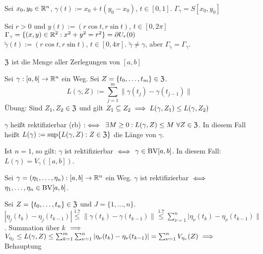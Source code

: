 \documentclass[a4paper,twoside,DIV15,BCOR12mm,chapterprefix=true,headings=twolinechapter]{scrbook}
\begin{document}
\begin{beispiele}
\item Sei $x_0, y_0\in\mathbb{R}^n$, $\gamma(t) := x_0 + t(y_0-x_0)$, $t\in[0,1]$. $\Gamma_\gamma=S[x_0,y_0]$
\item Sei $r>0$ und $y(t) := (r \cos t, r \sin t)$, $t\in[0,2\pi]$\\ $\Gamma_\gamma=\{(x,y)\in\mathbb{R}^2: x^2+y^2=r^2\} = \partial U_r(0)$ \\
$\tilde\gamma(t) := (r \cos t, r \sin t)$, $t\in[0,4\pi]$. $\tilde\gamma \ne \gamma$, aber $\Gamma_{\tilde\gamma} = \Gamma_\gamma$.
\end{beispiele}

\begin{erinnerung}
$\mathfrak{Z}$ ist die Menge aller Zerlegungen von $[a,b]$
\end{erinnerung}

\begin{definition}
Sei $\gamma:[a,b]\to \mathbb{R}^n$ ein Weg. Sei $Z=\{t_0, \ldots, t_m\} \in \mathfrak{Z}$.\\
$$L(\gamma,Z):= \sum_{j=1}^m\|\gamma(t_j) - \gamma(t_{j-1})\|$$
Übung: Sind $Z_1,Z_2\in\mathfrak{Z}$ und gilt $Z_1 \subseteq Z_2 \implies L(\gamma,Z_1) \le L(\gamma,Z_2)$

$\gamma$ heißt rektifizierbar (rb)  $:\iff$ $\exists M\ge0: L(\gamma,Z)\le M\ \forall Z\in\mathfrak{Z}$. In diesem Fall heißt $L(\gamma) := \sup\{L(\gamma,Z): Z\in\mathfrak{Z}\}$ die Länge von $\gamma$.

Ist $n=1$, so gilt: $\gamma$ ist rektifizierbar $\iff$ $\gamma\in \text{BV}[a,b]$. In diesem Fall: $L(\gamma) = V_\gamma([a,b])$.
\end{definition}

\begin{satz}
Sei $\gamma = (\eta_1, \ldots, \eta_n):[a,b]\to\mathbb{R}^n$ ein Weg. $\gamma$ ist rektifizierbar $\iff$ \mbox{$\eta_1,\ldots,\eta_n\in \text{BV}[a,b]$}.
\end{satz}

\begin{beweis}
Sei $Z = \{t_0,\ldots,t_n\} \in \mathfrak{Z}$ und $J=\{1,\ldots,n\}$.\\
$|\eta_j(t_k)-\eta_j(t_{k-1})| \stackrel{\text{1.7}}{\le} \|\gamma(t_k) - \gamma(t_{k-1})\| \stackrel{\text{1.7}}\le \sum_{\nu=1}^n |\eta_\nu(t_k) - \eta_\nu(t_{k-1})\|$. Summation über $k$ $\implies$ $V_{\eta_j} \le L(\gamma,Z) \le \sum_{k=1}^m\sum_{\nu=1}^n |\eta_\nu(t_k)-\eta_\nu(t_{k-1})| = \sum_{\nu=1}^n V_{\eta_\nu}(Z) \implies$ Behauptung
\end{beweis}
\end{document}
